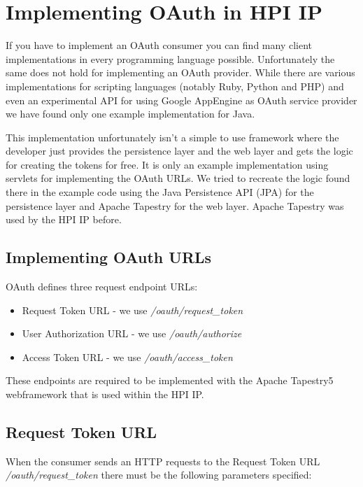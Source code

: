 \section{Implementing OAuth in HPI IP}

If you have to implement an OAuth consumer you can find many client
implementations in every programming language possible.
Unfortunately the same does not hold for implementing an OAuth
provider. While there are various implementations for scripting
languages (notably Ruby, Python and PHP) and even an experimental
API for using Google AppEngine as OAuth service provider \cite{gae-oauth} we have found only one
example implementation for Java. \cite{java-oauth} 

This implementation unfortunately isn't a simple to use framework
where the developer just provides the persistence layer and the web
layer and gets the logic for creating the tokens for free. It is only
an example implementation using servlets for implementing the OAuth URLs.
We tried to recreate the logic found there in the example code
using the Java Persistence API (JPA) for the persistence layer and
Apache Tapestry for the web layer. Apache Tapestry was used by the
HPI IP before.

\subsection{Implementing OAuth URLs}

OAuth defines three request endpoint URLs:

\begin{itemize}
\item
  Request Token URL - we use \emph{/oauth/request\_token}
\item
  User Authorization URL - we use \emph{/oauth/authorize}
\item
  Access Token URL - we use \emph{/oauth/access\_token}
\end{itemize}
These endpoints are required to be implemented with the Apache
Tapestry5 webframework that is used within the HPI IP.

\subsection{Request Token URL}

When the consumer sends an HTTP requests to the Request Token URL
\emph{/oauth/request\_token} there must be the following parameters
specified:

